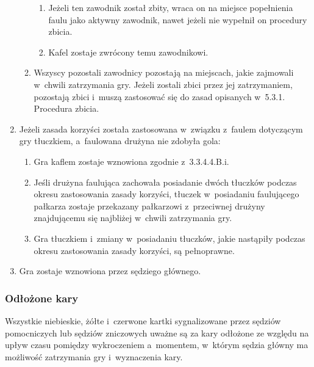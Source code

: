 \documentclass[12pt]{article}
\begin{document}
\begin{enumerate}
\begin{enumerate}
		            \begin{enumerate}
			            \item
			                  Jeżeli ten zawodnik został zbity, wraca on na miejsce popełnienia
			                  faulu jako aktywny zawodnik, nawet jeżeli nie wypełnił on
			                  procedury zbicia.
			            \item
			                  Kafel zostaje zwrócony temu zawodnikowi.
		            \end{enumerate}
		      \item
		            Wszyscy pozostali zawodnicy pozostają na miejscach, jakie zajmowali
		            w~chwili zatrzymania gry. Jeżeli zostali zbici przez jej
		            zatrzymaniem, pozostają zbici i~muszą zastosować się do zasad
		            opisanych w~5.3.1. Procedura zbicia.
	      \end{enumerate}
	\item
	      Jeżeli zasada korzyści została zastosowana w~związku z~faulem
	      dotyczącym gry tłuczkiem, a~faulowana drużyna nie zdobyła gola:

	      \begin{enumerate}
		      \item
		            Gra kaflem zostaje wznowiona zgodnie z~3.3.4.4.B.i.
		      \item
		            Jeśli drużyna faulująca zachowała posiadanie dwóch tłuczków podczas
		            okresu zastosowania zasady korzyści, tłuczek w~posiadaniu
		            faulującego pałkarza zostaje przekazany pałkarzowi z~przeciwnej
		            drużyny znajdującemu się najbliżej w~chwili zatrzymania gry.
		      \item
		            Gra tłuczkiem i~zmiany w~posiadaniu tłuczków, jakie nastąpiły
		            podczas okresu zastosowania zasady korzyści, są pełnoprawne.
	      \end{enumerate}
	\item
	      Gra zostaje wznowiona przez sędziego głównego.
\end{enumerate}

\subsubsection{Odłożone kary}

Wszystkie niebieskie, żółte i~czerwone kartki sygnalizowane przez
sędziów pomocniczych lub sędziów zniczowych uważne są za kary odłożone
ze względu na upływ czasu pomiędzy wykroczeniem a~momentem, w~którym
sędzia główny ma możliwość zatrzymania gry i~wyznaczenia kary.
\end{document}
